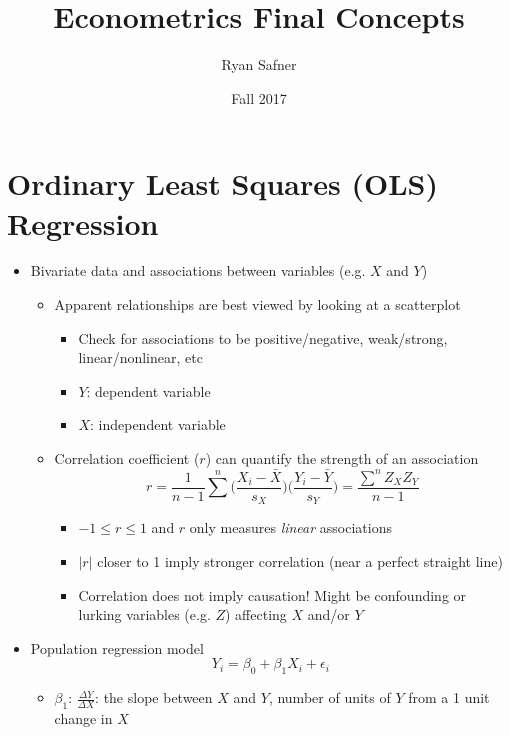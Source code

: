 \documentclass{article}
\title{Econometrics Final Concepts}
\author{Ryan Safner}
\date{Fall 2017}
\begin{document}
	
\maketitle

\section*{Ordinary Least Squares (OLS) Regression}

\begin{itemize}
	\item	Bivariate data and associations between variables (e.g. $X$ and $Y$)
	\begin{itemize}
		\item Apparent relationships are best viewed by looking at a scatterplot
		\begin{itemize}
			\item Check for associations to be positive/negative, weak/strong, linear/nonlinear, etc
			\item $Y$: dependent variable
			\item $X$: independent variable 
		\end{itemize}
		\item Correlation coefficient ($r$) can quantify the strength of an association
		\begin{equation*}
					r=\frac{1}{n-1} \sum^n \bigg(\frac{X_i-\bar{X}}{s_X}\bigg) \bigg(\frac{Y_i-\bar{Y}}{s_Y}\bigg) = \frac{\displaystyle \sum^n Z_X Z_Y}{n-1}	
		\end{equation*}
		\begin{itemize}
			\item $-1 \leq r \leq 1$ and $r$ only measures \emph{linear} associations
			\item $|r|$ closer to 1 imply stronger correlation (near a perfect straight line)  
			\item Correlation does not imply causation! Might be confounding or lurking variables (e.g. $Z$) affecting $X$ and/or $Y$
		\end{itemize}
	\end{itemize}
	\item Population regression model
	\begin{equation*}
Y_i=\beta_0+\beta_1X_i+\epsilon_i
	\end{equation*}
	\begin{itemize}
		\item $\beta_1$: $\frac{\Delta Y}{\Delta X}$: the slope between $X$ and $Y$, number of units of $Y$ from a 1 unit change in $X$ 

\end{itemize}
\end{itemize}
\end{document}

